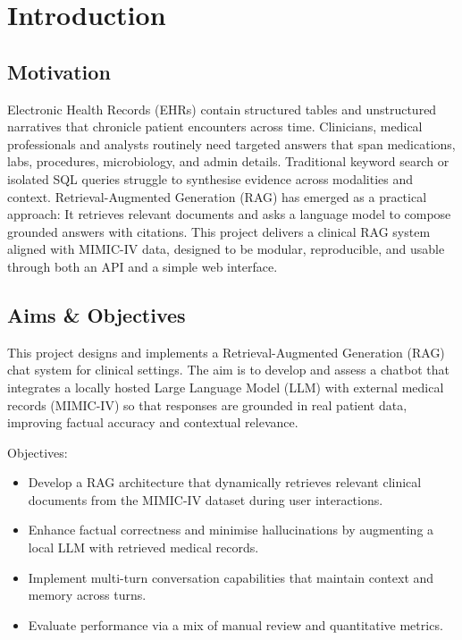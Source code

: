 \chapter{Introduction}

\section{Motivation}
Electronic Health Records (EHRs) contain structured tables and unstructured \mbox{narratives} that chronicle patient encounters across time. Clinicians, medical professionals and analysts routinely need \mbox{targeted} answers that span medications, labs, procedures, microbiology, and admin \mbox{details}. Traditional keyword search or isolated SQL queries struggle to synthesise \mbox{evidence} across modalities and context. \newline Retrieval-Augmented Generation (RAG) has emerged as a practical approach: \newline It retrieves relevant documents and asks a language model to compose grounded \mbox{answers} with citations. This project delivers a clinical RAG system aligned with MIMIC-IV data, designed to be modular, reproducible, and usable through both an API and a simple web interface.

\section{Aims \& Objectives}
This project designs and implements a Retrieval-Augmented Generation (RAG) chat system for clinical settings. The aim is to develop and assess a chatbot that integrates a locally hosted Large Language Model (LLM) with external medical records \mbox{(MIMIC-IV)} so that responses are grounded in real patient data, improving factual accuracy and contextual relevance.

\noindent Objectives:
\begin{itemize}
  \item Develop a RAG architecture that dynamically retrieves relevant clinical documents from the MIMIC-IV dataset during user interactions.
  \item Enhance factual correctness and minimise hallucinations by augmenting a local LLM with retrieved medical records.
  \item Implement multi-turn conversation capabilities that maintain context and memory across turns.
  \item Evaluate performance via a mix of manual review and quantitative metrics.
\end{itemize}

